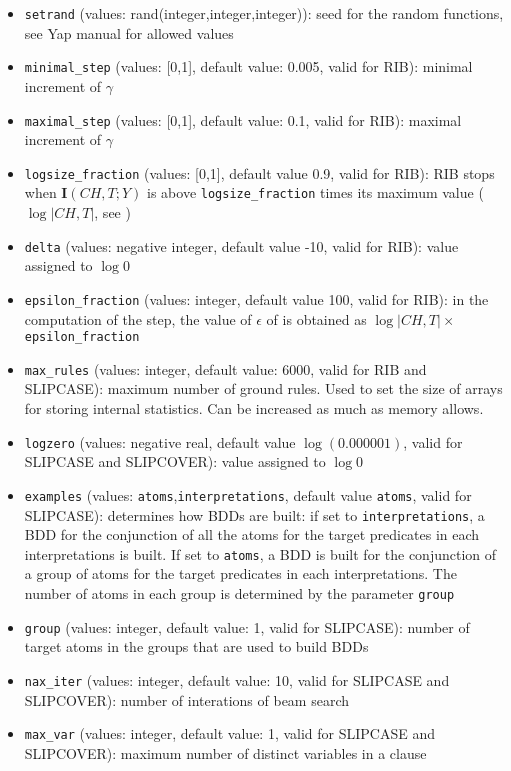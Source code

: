 \documentclass[a4paper,10pt]{article}
\begin{document}
\begin{itemize}
\item \verb|setrand| (values: rand(integer,integer,integer)): seed for the random functions, see Yap manual for allowed values
\item \verb|minimal_step| (values: [0,1], default value: 0.005, valid for RIB): minimal increment of $\gamma$
\item \verb|maximal_step| (values: [0,1], default value: 0.1, valid for RIB): maximal increment of $\gamma$
\item \verb|logsize_fraction| (values: [0,1], default value 0.9, valid for RIB): RIB stops when $\mathbf{I}(CH,T;Y)$ is above \verb|logsize_fraction| times its maximum value ($\log |CH,T|$, see \cite{DBLP:journals/jmlr/ElidanF05})
\item \verb|delta| (values: negative integer, default value -10, valid for RIB): value assigned to $\log 0$
\item \verb|epsilon_fraction| (values: integer, default value 100, valid for RIB): in the computation of the step, the value of $\epsilon$ of \cite{DBLP:journals/jmlr/ElidanF05} is obtained as $\log |CH,T|\times$\verb|epsilon_fraction|
\item \verb|max_rules| (values: integer, default value: 6000, valid for RIB and SLIPCASE): maximum number of ground rules. Used to set the size of arrays for storing internal statistics. Can be increased as much as memory allows.
\item \verb|logzero| (values: negative real, default value $\log(0.000001)$, valid for SLIPCASE and SLIPCOVER): value assigned to $\log 0$
\item \verb|examples| (values: \verb|atoms|,\verb|interpretations|, default value \verb|atoms|, valid for SLIPCASE): determines how BDDs are built: if set to \verb|interpretations|, a BDD for the conjunction of all the atoms for the target predicates in each interpretations is built. 
If set to \verb|atoms|, a BDD is built for the conjunction of a group of atoms for the target predicates in each interpretations. The number of atoms in each group is determined by the parameter \verb|group|
\item \verb|group| (values: integer, default value: 1, valid for SLIPCASE): number of target atoms in the groups that are used to build BDDs
\item \verb|nax_iter| (values: integer, default value: 10, valid for SLIPCASE and SLIPCOVER): number of interations of beam search
\item \verb|max_var| (values: integer, default value: 1, valid for SLIPCASE and SLIPCOVER): maximum number of distinct variables in a clause

\end{itemize}
\end{document}
